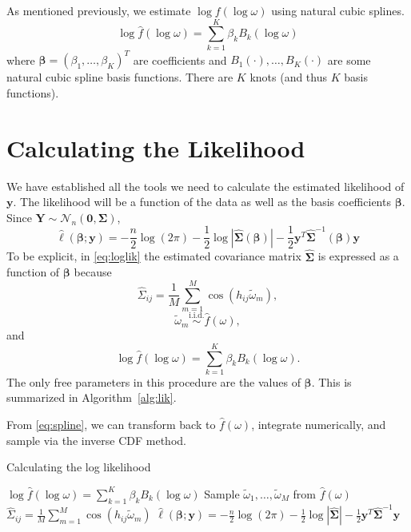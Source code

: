 As mentioned previously, we estimate $\log f(\log \omega)$ using natural cubic splines.
\begin{equation} \label{eq:spline}
	\log \hat{f}(\log \omega) = \sum_{k=1}^K \beta_k B_k(\log \omega)
\end{equation}
where $\bm{\beta} = (\beta_1, \dots, \beta_K)^T$ are coefficients and $B_1(\cdot), \dots, B_K(\cdot)$ are some natural cubic spline basis functions. There are $K$ knots (and thus $K$ basis functions).


\section{Calculating the Likelihood} %
\label{sec:calculating_the_likelihood}

We have established all the tools we need to calculate the estimated likelihood of $\bm{y}$. The likelihood will be a function of the data as well as the basis coefficients $\bm{\beta}$. Since $\bm{Y} \sim \mathcal{N}_n(\bm{0}, \bm{\Sigma})$,
\begin{equation} \label{eq:loglik}
	\hat{\ell}(\bm{\beta}; \bm{y}) = -\frac{n}{2} \log(2\pi) - \frac{1}{2} \log |\widehat{\bm{\Sigma}}(\bm{\beta})| - \frac{1}{2} \bm{y}^T \widehat{\bm{\Sigma}}^{-1}(\bm{\beta}) \bm{y}
\end{equation}
To be explicit, in \eqref{eq:loglik} the estimated covariance matrix $\widehat{\bm{\Sigma}}$ is expressed as a function of $\bm{\beta}$ because
\[
	\widehat{\Sigma}_{ij} = \frac{1}{M} \sum_{m=1}^M \cos(h_{ij} \widetilde{\omega}_m),
\]
\[
	\widetilde{\omega}_m \overset{\textrm{i.i.d.}}{\sim} \hat{f}(\omega),
\]
and
\[
	\log \hat{f}(\log \omega) = \sum_{k=1}^K \beta_k B_k(\log \omega).
\]
The only free parameters in this procedure are the values of $\bm{\beta}$. This is summarized in Algorithm~\ref{alg:lik}.

From \eqref{eq:spline}, we can transform back to $\hat{f}(\omega)$, integrate numerically, and sample via the inverse CDF method.

\begin{algorithm}[!htb]
	\caption{\small Calculating the log likelihood} \label{alg:lik}
	\begin{algorithmic}[1]
		\State $\log \hat{f}(\log \omega) = \sum_{k=1}^K \beta_k B_k(\log \omega)$
		\State Sample $\widetilde{\omega}_1, \dots, \widetilde{\omega}_M$ from $\hat{f}(\omega)$
			\State $\widehat{\Sigma}_{ij} = \frac{1}{M} \sum_{m=1}^M \cos(h_{ij} \widetilde{\omega}_m)$
		\EndFor
		\State $\hat{\ell}(\bm{\beta}; \bm{y}) = -\frac{n}{2} \log(2\pi) - \frac{1}{2} \log |\widehat{\bm{\Sigma}}| - \frac{1}{2} \bm{y}^T \widehat{\bm{\Sigma}}^{-1} \bm{y}$
		\EndProcedure
	\end{algorithmic}
\end{algorithm}

